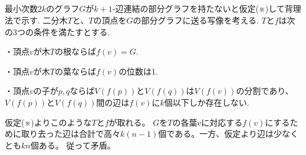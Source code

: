 \subsection{}
最小次数$2k$のグラフ$G$が$k+1$-辺連結の部分グラフを持たないと仮定(※)して背理法で示す.
二分木$T$と、$T$の頂点を$G$の部分グラフに送る写像を考える.
$T$と$f$は次の3つの条件を満たすとする.

・頂点$v$が木$T$の根ならば$f(v)=G$.

・頂点$v$が木$T$の葉ならば$f(v)$の位数は1.

・頂点$v$の子が$p,q$ならば$V(f(p))$と$V(f(q))$は$V(f(v))$の分割であり、$V(f(p))$と$V(f(q))$間の辺は$f(v)$に$k$個以下しか存在しない.

仮定(※)よりこのような$T$と$f$が取れる。
$G$を$T$の各葉$v$に対応する$f(v)$にするために取り去った辺は合計で高々$k(n-1)$個である。一方、仮定より辺は少なくとも$kn$個ある。
従って矛盾。
